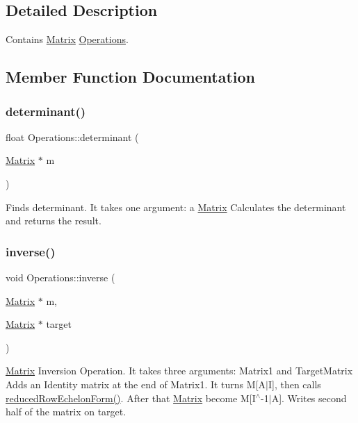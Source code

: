 \subsection{Detailed Description}
Contains \hyperlink{class_matrix}{Matrix} \hyperlink{class_operations}{Operations}. 

\subsection{Member Function Documentation}
\mbox{\label{class_operations_a4128cc9366ded09e0a96ef7b229a8d30}} 
\subsubsection{\texorpdfstring{determinant()}{determinant()}}
{\footnotesize\ttfamily float Operations\+::determinant (\begin{DoxyParamCaption}\item[{\hyperlink{class_matrix}{Matrix} $\ast$}]{m }\end{DoxyParamCaption})}

Finds determinant. It takes one argument\+: a \hyperlink{class_matrix}{Matrix} Calculates the determinant and returns the result. \mbox{\label{class_operations_a6abe02b47920ad0f5a4b87a16d1e8bd0}} 
\subsubsection{\texorpdfstring{inverse()}{inverse()}}
{\footnotesize\ttfamily void Operations\+::inverse (\begin{DoxyParamCaption}\item[{\hyperlink{class_matrix}{Matrix} $\ast$}]{m,  }\item[{\hyperlink{class_matrix}{Matrix} $\ast$}]{target }\end{DoxyParamCaption})}

\hyperlink{class_matrix}{Matrix} Inversion Operation. It takes three arguments\+: Matrix1 and Target\+Matrix Adds an Identity matrix at the end of Matrix1. It turns M\mbox{[}A$\vert$I\mbox{]}, then calls \hyperlink{class_operations_a34a11aa508d4fa8343dea7ce3cb12a8f}{reduced\+Row\+Echelon\+Form()}. After that \hyperlink{class_matrix}{Matrix} become M\mbox{[}I$^\wedge$-\/1$\vert$A\mbox{]}. Writes second half of the matrix on target. \mbox{\label{class_operations_a9187a03ccde6ce58d8a79e0799ae0579}} 
